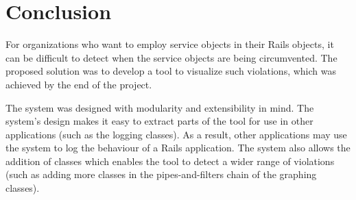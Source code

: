 \chapter{Conclusion}
\label{chap:conclusions}

For organizations who want to employ service objects in their Rails objects, it can be difficult to detect when the service objects are being circumvented. The proposed solution was to develop a tool to visualize such violations, which was achieved by the end of the project.

The system was designed with modularity and extensibility in mind. The system's design makes it easy to extract parts of the tool for use in other applications (such as the logging classes). As a result, other applications may use the system to log the behaviour of a Rails application. The system also allows the addition of classes which enables the tool to detect a wider range of violations (such as adding more classes in the pipes-and-filters chain of the graphing classes). 

